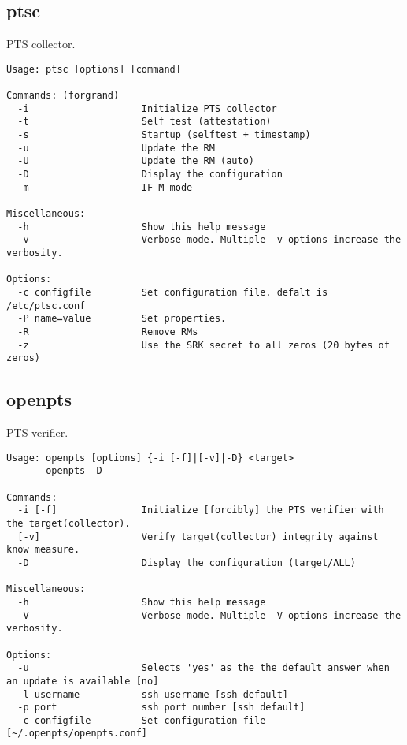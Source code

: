 \lstset{frame=trbl}
\lstset{language=}
\lstset{commentstyle=\textit}
\lstset{basicstyle=\small}

\subsection{ptsc} 

PTS collector.

\begin{lstlisting}[style=help_message]
Usage: ptsc [options] [command]

Commands: (forgrand)
  -i                    Initialize PTS collector
  -t                    Self test (attestation)
  -s                    Startup (selftest + timestamp)
  -u                    Update the RM
  -U                    Update the RM (auto)
  -D                    Display the configuration
  -m                    IF-M mode

Miscellaneous:
  -h                    Show this help message
  -v                    Verbose mode. Multiple -v options increase the verbosity.

Options:
  -c configfile         Set configuration file. defalt is /etc/ptsc.conf
  -P name=value         Set properties.
  -R                    Remove RMs
  -z                    Use the SRK secret to all zeros (20 bytes of zeros)
\end{lstlisting}


\subsection{openpts} 

PTS verifier.

\begin{lstlisting}[style=help_message]
Usage: openpts [options] {-i [-f]|[-v]|-D} <target>
       openpts -D

Commands:
  -i [-f]               Initialize [forcibly] the PTS verifier with the target(collector).
  [-v]                  Verify target(collector) integrity against know measure.
  -D                    Display the configuration (target/ALL)

Miscellaneous:
  -h                    Show this help message
  -V                    Verbose mode. Multiple -V options increase the verbosity.

Options:
  -u                    Selects 'yes' as the the default answer when an update is available [no]
  -l username           ssh username [ssh default]
  -p port               ssh port number [ssh default]
  -c configfile         Set configuration file [~/.openpts/openpts.conf]
\end{lstlisting}

